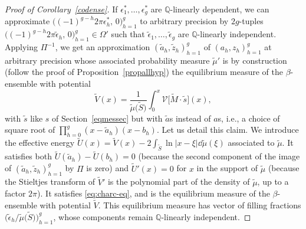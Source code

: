 \documentclass[pdftex]{sigma}
\numberwithin{equation}{section}
\begin{document}
\begin{proof}[Proof of Corollary~\ref{codense}]
If $\epsilon_1^*,\ldots,\epsilon_g^*$ are $\mathbb{Q}$-linearly dependent, we can approximate $\bigl((-1)^{g-h}2\pi \epsilon_h^* ,\,0\bigr)_{h = 1}^{g}$ to arbitrary precision by $2g$-tuples $\bigl((-1)^{g-h}2\pi \tilde{\epsilon}_h ,\,0\bigr)_{h = 1}^{g} \in \Omega'$ such that $\tilde{\epsilon}_1,\ldots,\tilde{\epsilon}_g$ are $\mathbb{Q}$-linearly independent. Applying $\Pi^{-1}$, we get an approximation $(\tilde{a}_h,\tilde{z}_h)_{h = 1}^{g}$ of $(a_h,z_h)_{h = 1}^{g}$ at arbitrary precision whose associated probability measure $\tilde{\mu}'$ is by construction (follow the proof of Proposition~\ref{propallhyp}) the equilibrium measure of the $\beta$-ensemble with potential
\[
\tilde{V}(x) = \frac{1}{\tilde{\mu}\big(\tilde{S}\big)} \int_0^{x} \mathcal{V}\bigl[\tilde{M}\cdot \tilde{s}\bigr](x),
\]
with $\tilde{s}$ like $s$ of Section~\ref{eqmessec} but with
$\tilde{a}$s instead of $a$s, i.e., a choice of square root of
$\prod_{h = 0}^{g}(x - \tilde{a}_{h})(x - b_{h})$. Let us detail this
claim. We introduce the effective energy
$\tilde{U}(x) = \tilde{V}(x) - 2\int_{\tilde{S}}\ln|x - \xi| \dd \tilde{\mu}(\xi)$
associated to $\tilde{\mu}$. It satisfies both
$\tilde{U}(\tilde{a}_{h}) - \tilde{U}(b_{h}) = 0$
(because the second component of the image of
$(\tilde{a}_{h}, \tilde{z}_{h})_{h=1}^{g}$ by $\Pi$ is zero) and
$\tilde{U}'(x) = 0$ for $x$ in the support of $\tilde{\mu}$ (because the Stieltjes
transform of $\tilde{V}'$ is the polynomial part of the density of
$\tilde{\mu}$, up to a factor $2\pi$). It satisfies \eqref{eq:charc-eq},
and is the equilibrium measure of the $\beta$-ensemble with potential
$\tilde{V}$. This equilibrium measure has vector of filling fractions
$\bigl(\tilde{\epsilon}_h/\tilde{\mu}\big(\tilde{S}\big)\bigr)_{h = 1}^{g}$, whose components
remain $\mathbb{Q}$-linearly independent.
\end{proof}
\end{document}

